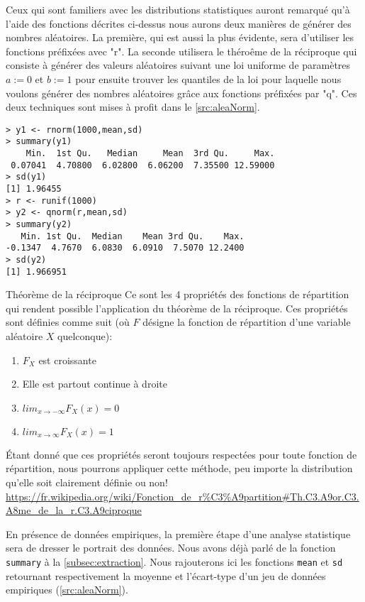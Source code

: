 Ceux qui sont familiers avec les distributions statistiques auront remarqué qu'à l'aide des fonctions décrites ci-dessus nous aurons deux manières de générer des nombres aléatoires. La première, qui est aussi la plus évidente, sera d'utiliser les fonctions préfixées avec "r". La seconde utilisera le théroême de la réciproque qui consiste à générer des valeurs aléatoires suivant une loi uniforme de paramètres $a := 0$ et $b := 1$ pour ensuite trouver les quantiles de la loi pour laquelle nous voulons générer des nombres aléatoires grâce aux fonctions préfixées par "q". Ces deux techniques sont mises à profit dans le \autoref{src:aleaNorm}. \\

\begin{lstlisting}[caption = Génération de nombres aléatoires,label=src:aleaNorm]
> y1 <- rnorm(1000,mean,sd)
> summary(y1)
    Min.  1st Qu.   Median     Mean  3rd Qu.     Max. 
 0.07041  4.70800  6.02800  6.06200  7.35500 12.59000 
> sd(y1)
[1] 1.96455
> r <- runif(1000)
> y2 <- qnorm(r,mean,sd)
> summary(y2)
   Min. 1st Qu.  Median    Mean 3rd Qu.    Max. 
-0.1347  4.7670  6.0830  6.0910  7.5070 12.2400 
> sd(y2)
[1] 1.966951
\end{lstlisting}

\begin{moreInfo}{Théorème de la réciproque}
	Ce sont les 4 propriétés des fonctions de répartition qui rendent possible l'application du théorème de la réciproque. Ces propriétés sont définies comme suit (où $F$ désigne la fonction de répartition d'une variable aléatoire $X$ quelconque):
	\begin{enumerate}
		\item $F_X$ est croissante
		\item Elle est partout continue à droite
		\item $lim_{x \rightarrow -\infty} F_X(x) = 0$
		\item $lim_{x \rightarrow \infty} F_X(x) = 1$
	\end{enumerate}
	Étant donné que ces propriétés seront toujours respectées pour toute fonction de répartition, nous pourrons appliquer cette méthode, peu importe la distribution qu'elle soit clairement définie ou non! \\
	\url{https://fr.wikipedia.org/wiki/Fonction_de_r%C3%A9partition#Th.C3.A9or.C3.A8me_de_la_r.C3.A9ciproque}
\end{moreInfo}

En présence de données empiriques, la première étape d'une analyse statistique sera de dresser le portrait des données. Nous avons déjà parlé de la fonction \texttt{summary} à la \autoref{subsec:extraction}. Nous rajouterons ici les fonctions \texttt{mean} et \texttt{sd} retournant respectivement la moyenne et l'écart-type d'un jeu de données empiriques (\autoref{src:aleaNorm}). \\

